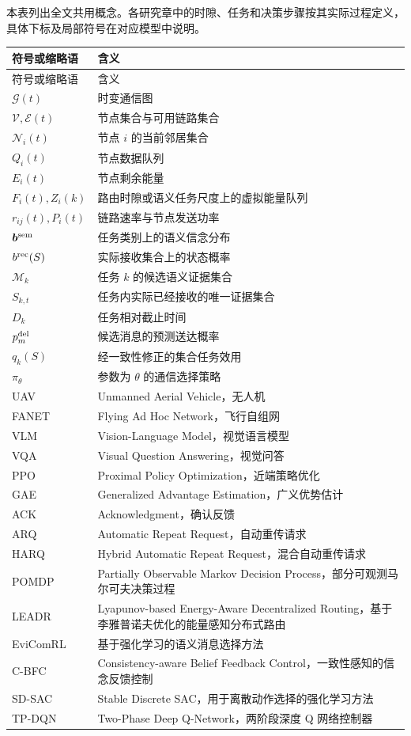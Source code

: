 \begin{denotation}

\noindent 本表列出全文共用概念。各研究章中的时隙、任务和决策步骤按其实际过程定义，具体下标及局部符号在对应模型中说明。

\begin{longtable}{@{}p{31mm}p{111mm}@{}}
\toprule
符号或缩略语&含义\\
\midrule
\endfirsthead
\toprule 符号或缩略语&含义\\\midrule
\endhead
\bottomrule\endfoot
$\mathcal G(t)$&时变通信图\\
$\mathcal V,\mathcal E(t)$&节点集合与可用链路集合\\
$\mathcal N_i(t)$&节点 $i$ 的当前邻居集合\\
$Q_i(t)$&节点数据队列\\
$E_i(t)$&节点剩余能量\\
$F_i(t),Z_i(k)$&路由时隙或语义任务尺度上的虚拟能量队列\\
$r_{ij}(t),P_i(t)$&链路速率与节点发送功率\\
$\bm b^{\rm sem}$&任务类别上的语义信念分布\\
$b^{\rm rec}(S)$&实际接收集合上的状态概率\\
$\mathcal M_k$&任务 $k$ 的候选语义证据集合\\
$S_{k,t}$&任务内实际已经接收的唯一证据集合\\
$D_k$&任务相对截止时间\\
$p_m^{\rm del}$&候选消息的预测送达概率\\
$q_k(S)$&经一致性修正的集合任务效用\\
$\pi_\theta$&参数为 $\theta$ 的通信选择策略\\
UAV&Unmanned Aerial Vehicle，无人机\\
FANET&Flying Ad Hoc Network，飞行自组网\\
VLM&Vision-Language Model，视觉语言模型\\
VQA&Visual Question Answering，视觉问答\\
PPO&Proximal Policy Optimization，近端策略优化\\
GAE&Generalized Advantage Estimation，广义优势估计\\
ACK&Acknowledgment，确认反馈\\
ARQ&Automatic Repeat Request，自动重传请求\\
HARQ&Hybrid Automatic Repeat Request，混合自动重传请求\\
POMDP&Partially Observable Markov Decision Process，部分可观测马尔可夫决策过程\\
LEADR&Lyapunov-based Energy-Aware Decentralized Routing，基于李雅普诺夫优化的能量感知分布式路由\\
EviComRL&基于强化学习的语义消息选择方法\\
C-BFC&Consistency-aware Belief Feedback Control，一致性感知的信念反馈控制\\
SD-SAC&Stable Discrete SAC，用于离散动作选择的强化学习方法\\
TP-DQN&Two-Phase Deep Q-Network，两阶段深度 Q 网络控制器\\
\end{longtable}
\end{denotation}
